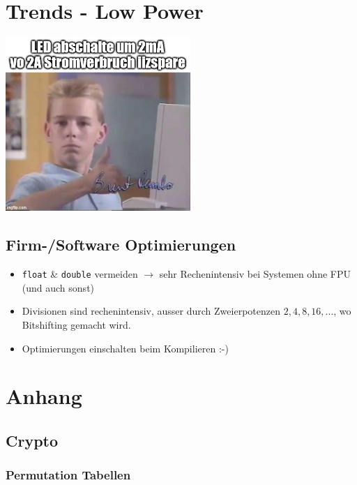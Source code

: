 \documentclass[
  10pt,
  a4paper,
]{article}
\providecommand{\tightlist}{%
  \setlength{\itemsep}{0pt}\setlength{\parskip}{0pt}}\usepackage{longtable,booktabs,array}
\begin{document}
\begin{multicols*}{2}
\newpage

\section{Trends - Low Power}\label{trends---low-power}

\begin{center}
\includegraphics[width=7cm,height=\textheight]{images/trends_meme.jpg}
\end{center}

\subsection{Firm-/Software
Optimierungen}\label{firm-software-optimierungen}

\begin{itemize}
\tightlist
\item
  \texttt{float} \& \texttt{double} vermeiden \(\rightarrow\) sehr
  Rechenintensiv bei Systemen ohne FPU (und auch sonst)
\item
  Divisionen sind rechenintensiv, ausser durch Zweierpotenzen
  \(2,4,8,16,...\), wo Bitshifting gemacht wird.
\item
  Optimierungen einschalten beim Kompilieren :-)
\end{itemize}

\newpage

\section{Anhang}\label{anhang}

\subsection{Crypto}\label{crypto-1}

\subsubsection{Permutation Tabellen}\label{permutation-tabellen}


\end{multicols*}
\end{document}
